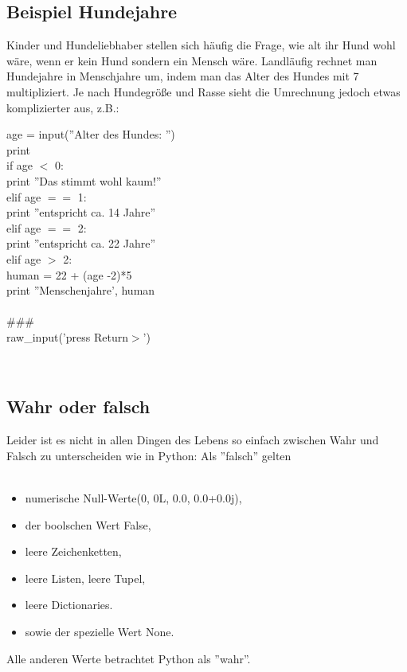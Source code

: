 \subsection{Beispiel Hundejahre}
Kinder und Hundeliebhaber stellen sich häufig die Frage, wie alt ihr Hund wohl wäre, wenn er kein Hund sondern ein Mensch wäre. Landläufig rechnet man Hundejahre in Menschjahre um, indem man das Alter des Hundes mit 7 multipliziert. Je nach Hundegröße und Rasse sieht die Umrechnung jedoch etwas komplizierter aus, z.B.: 
\\
\begin{MyConsoleBox}{
age = input(''Alter des Hundes: '')     \\
print                                   \\
if age $<$ 0:                           \\
	print ''Das stimmt wohl kaum!''     \\
elif age $==$ 1:                          \\
	print ''entspricht ca. 14 Jahre''   \\
elif age $==$ 2:                          \\
	print ''entspricht ca. 22 Jahre''   \\
elif age $>$ 2:                         \\
	human = 22 + (age -2)*5             \\
	print ''Menschenjahre', human       \\
                                        \\
\#\#\#                                  \\
raw\_input('press Return$>$')              \\
}\end{MyConsoleBox}
\\
\subsection{Wahr oder falsch}
Leider ist es nicht in allen Dingen des Lebens so einfach zwischen Wahr und Falsch zu unterscheiden wie in Python:
Als ''falsch'' gelten \\
\\
\begin{itemize}
\item numerische Null-Werte(0, 0L, 0.0, 0.0+0.0j), 
\item der boolschen Wert False, 
\item leere Zeichenketten, 
\item leere Listen, leere Tupel, 
\item leere Dictionaries. 
\item sowie der spezielle Wert None. 
\end{itemize}
Alle anderen Werte betrachtet Python als ''wahr''.
\\
